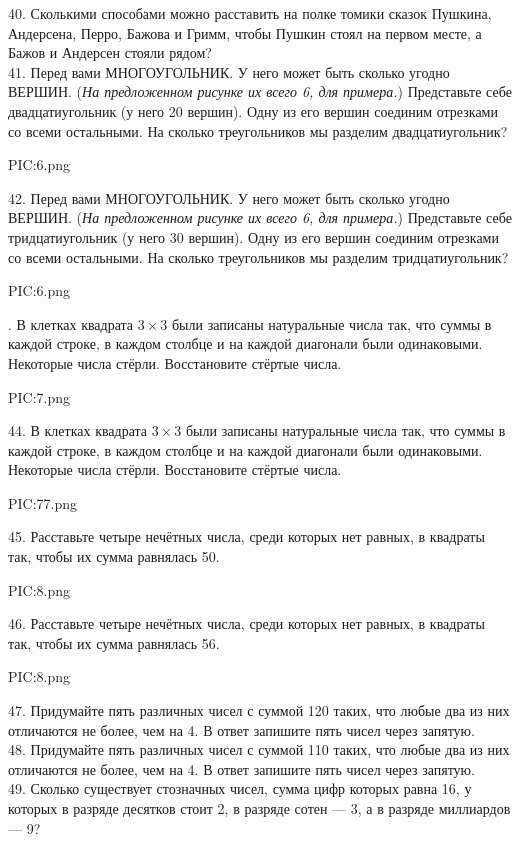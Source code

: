 40. Сколькими способами можно расставить на полке томики сказок Пушкина, Андерсена, Перро, Бажова и Гримм, чтобы Пушкин стоял на первом месте, а Бажов и Андерсен стояли рядом?\\
41. Перед вами МНОГОУГОЛЬНИК. У него может быть сколько угодно ВЕРШИН. ({\it На предложенном рисунке их всего 6, для примера.}) Представьте себе двадцатиугольник (у него 20 вершин). Одну из его вершин соединим отрезками со всеми остальными. На сколько треугольников мы разделим двадцатиугольник?
\begin{center}
{{PIC:6.png}}
\end{center}
42. Перед вами МНОГОУГОЛЬНИК. У него может быть сколько угодно ВЕРШИН. ({\it На предложенном рисунке их всего 6, для примера.}) Представьте себе тридцатиугольник (у него 30 вершин). Одну из его вершин соединим отрезками со всеми остальными. На сколько треугольников мы разделим тридцатиугольник?
\begin{center}
{{PIC:6.png}}
\end{center}
\newpage
{}. В клетках квадрата $3\times3$ были записаны натуральные числа так, что суммы в каждой строке, в каждом столбце и на каждой диагонали были одинаковыми. Некоторые числа стёрли. Восстановите стёртые числа.
\begin{center}
{{PIC:7.png}}
\end{center}
44. В клетках квадрата $3\times3$ были записаны натуральные числа так, что суммы в каждой строке, в каждом столбце и на каждой диагонали были одинаковыми. Некоторые числа стёрли. Восстановите стёртые числа.
\begin{center}
{{PIC:77.png}}
\end{center}
45. Расставьте четыре нечётных числа, среди которых нет равных, в квадраты так, чтобы их сумма равнялась 50.
\begin{center}
{{PIC:8.png}}
\end{center}
46. Расставьте четыре нечётных числа, среди которых нет равных, в квадраты так, чтобы их сумма равнялась 56.
\begin{center}
{{PIC:8.png}}
\end{center}
47. Придумайте пять различных чисел с суммой 120 таких, что любые два из них отличаются не более, чем на 4. В ответ запишите пять чисел через запятую.\\
48. Придумайте пять различных чисел с суммой 110 таких, что любые два из них отличаются не более, чем на 4. В ответ запишите пять чисел через запятую.\\
49. Сколько существует стозначных чисел, сумма цифр которых равна 16, у которых в разряде десятков стоит 2, в разряде сотен --- 3, а в разряде миллиардов --- 9?\\

